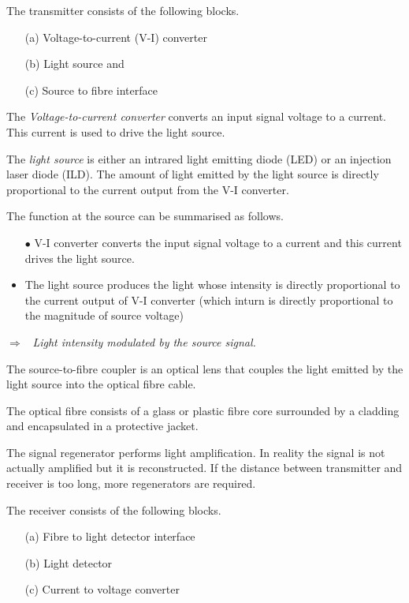 The transmitter consists of the following blocks.
\begin{itemize}
\item[(a)] Voltage-to-current (V-I) converter

\item[(b)] Light source and

\item[(c)] Source to fibre interface
\end{itemize}

The {\em Voltage-to-current converter} converts an input signal voltage to a current. This current is used to drive the light source.

The {\em light source} is either an intrared  light emitting diode (LED) or an injection laser diode (ILD). The amount of light emitted by the light source is directly proportional to the current output from the V-I converter.

The function at the source can be summarised as follows.
\begin{itemize}
\item[$\bullet$] V-I converter converts the input signal voltage to a current and this current drives the light source.

\item The light source produces the light whose intensity is directly proportional to the current output of V-I converter (which inturn is directly proportional to the magnitude of source voltage)
\end{itemize}
$\Rightarrow$~ {\em Light intensity modulated by the source signal.}

The source-to-fibre coupler is an optical lens that couples the light emitted by the light source into the optical fibre cable.

The optical fibre consists of a glass or plastic fibre core surrounded by a cladding and encapsulated in a protective jacket.

The signal regenerator performs light amplification. In reality the signal is not actually amplified but it is reconstructed. If the distance between transmitter and receiver is too long, more regenerators are required.

The receiver consists of the following blocks.
\begin{itemize}
\item[(a)] Fibre to light detector interface

\item[(b)] Light detector

\item[(c)] Current to voltage converter
\end{itemize}

